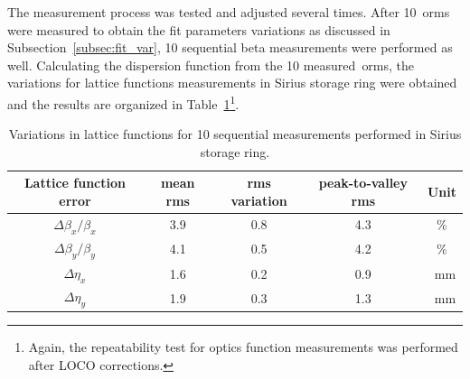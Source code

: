 The measurement process was tested and adjusted several times. After 10~\gls{orm}s were measured to obtain the fit parameters variations as discussed in Subsection~\ref{subsec:fit_var}, 10 sequential beta measurements were performed as well. Calculating the dispersion function from the 10 measured~\gls{orm}s, the variations for lattice functions measurements in Sirius storage ring were obtained and the results are organized in Table~\ref{tab:twiss_var_meas}\footnote{Again, the repeatability test for optics function measurements was performed after LOCO corrections.}. 
\begin{table}
    \centering
    \caption{Variations in lattice functions for 10 sequential measurements performed in Sirius storage ring.}
    \label{tab:twiss_var_meas}
    \begin{tabular}{ccccc}
        \toprule\toprule
        Lattice function error & mean rms & rms variation & peak-to-valley rms & Unit \\
        \hline
        $\Delta \beta_x/\beta_x$ & \num{3.9}& \num{0.8}  & \num{4.3} & \%\\
        $\Delta \beta_y/\beta_y$ & \num{4.1} & \num{0.5} & \num{4.2} & \% \\
        $\Delta \eta_x$ & \num{1.6} & \num{0.2} &          \num{0.9} &   \SI{}{\milli\meter}\\
        $\Delta \eta_y$ & \num{1.9} & \num{0.3} &          \num{1.3} & \SI{}{\milli\meter} \\
        \bottomrule\bottomrule
    \end{tabular}
\end{table}

